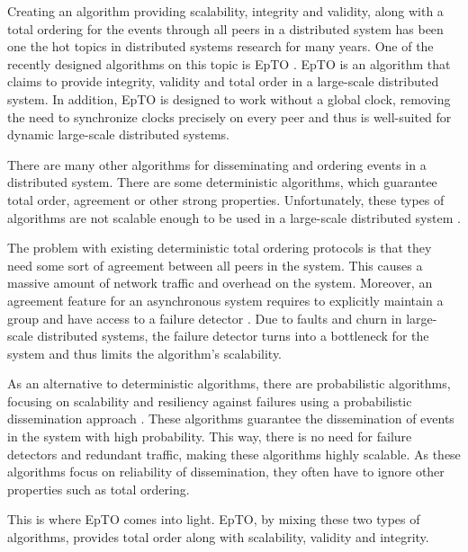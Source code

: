 \documentclass[10pt,conference,a4paper]{IEEEtran}
\begin{document}
Creating an algorithm providing scalability, integrity and validity, along with a total ordering for the events through all peers in a distributed system has been one the hot topics in distributed systems research for many years. One of the recently designed algorithms on this topic is EpTO \autocite{matos2015epto}. EpTO is an algorithm that claims to provide integrity, validity and total order in a large-scale distributed system. In addition, EpTO is designed to work without a global clock, removing the need to synchronize clocks precisely on every peer and thus is well-suited for dynamic large-scale distributed systems.
\par 
There are many other algorithms for disseminating and ordering events in a distributed system. There are some deterministic algorithms, which guarantee total order, agreement or other strong properties. Unfortunately, these types of algorithms are not scalable enough to be used in a large-scale distributed system \autocites[]{defago2004total}[]{lamport1978time}.
\par
The problem with existing deterministic total ordering protocols is that they need some sort of agreement between all peers in the system. This causes a massive amount of network traffic and overhead on the system.
Moreover, an agreement feature for an asynchronous system requires to
explicitly maintain a group and have access to a failure detector \autocites[]{chandra1996weakest}[]{chandra1996unreliable}. Due to faults and churn in large-scale distributed systems, the failure detector turns into a bottleneck for the system and thus limits the algorithm's scalability.
\par
As an alternative to deterministic algorithms, there are probabilistic algorithms, focusing on scalability and resiliency against failures using a probabilistic dissemination approach \autocites []{birman1999bimodal}[]{carvalho2007emergent}[]{demers1987epidemic}[]{eugster2003lightweight}[]{felber2002probabilistic}[]{hayden1996probabilistic}[]{kim2004gossip}[]{Koldehofe02simplegossiping}. These algorithms guarantee the dissemination of events in the system with high probability. This way, there is no need for failure detectors and redundant traffic, making these algorithms highly scalable. As these algorithms focus on reliability of dissemination, they often have to ignore other properties such as total ordering.
\par
This is where EpTO comes into light. EpTO, by mixing these two types of algorithms, provides total order along with scalability, validity and integrity. 
\end{document}
